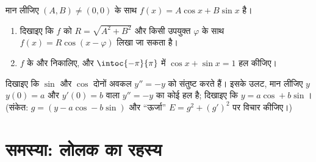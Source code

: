 \begin{exercise}[$\star\star\star$]\label{exo:g12:trigo:8}
मान लीजिए $(A,B) \neq (0,0)$ के साथ $f(x) = A\cos x + B \sin x$ है।
\begin{enumerate}
  \item दिखाइए कि $f$ को $R = \sqrt{A^2 + B^2}$ और किसी उपयुक्त $\varphi$ के साथ $f(x) = R\cos(x - \varphi)$ लिखा जा
        सकता है।
  \item $f$ के  और  निकालिए, और $\intoc{-\pi}{\pi}$ में $\cos x + \sin x = 1$ हल कीजिए।
\end{enumerate}
\end{exercise}

\begin{exercise}[$\star\star\star$]\label{exo:g12:trigo:9}
दिखाइए कि $\sin$ और $\cos$ दोनों अवकल  $y'' = -y$ को संतुष्ट करते हैं। इसके
उलट, मान लीजिए $y$ $y(0) = a$ और $y'(0) = b$ वाला $y'' = -y$ का कोई हल है; दिखाइए कि $y = a\cos + b\sin$।
(संकेत: $g = (y - a\cos - b\sin)$ और ``ऊर्जा'' $E = g^2 + (g')^2$ पर विचार कीजिए।)
\end{exercise}

\section{समस्या: लोलक का रहस्य}

